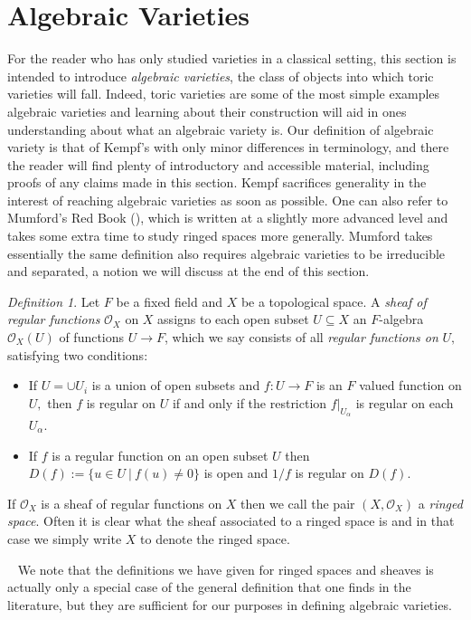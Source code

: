 \documentclass[BSc]{usydthesis}
\numberwithin{equation}{chapter}
\theoremstyle{remark}
\newtheorem{Definition}[equation]{Definition}
\begin{document}
\section{Algebraic Varieties}
For the reader who has only studied varieties in a classical setting, this section is intended to introduce {\em algebraic varieties}, the class of objects into which toric varieties will fall. Indeed, toric varieties are some of the most simple examples algebraic varieties and learning about their construction will aid in ones understanding about what an algebraic variety is. Our definition of algebraic variety is that of Kempf's \cite{Kempf} with only minor differences in terminology, and there the reader will find plenty of introductory and accessible material, including proofs of any claims made in this section. Kempf sacrifices generality in the interest of reaching algebraic varieties as soon as possible. One can also refer to Mumford's Red Book (\cite{MumfordRedBook}), which is written at a slightly more advanced level and takes some extra time to study ringed spaces more generally. Mumford takes essentially the same definition also requires algebraic varieties to be irreducible and separated, a notion we will discuss at the end of this section.
~
\begin{Definition}
Let $F$ be a fixed field and $X$ be a topological space. A {\em sheaf of regular functions} $\mathcal{O}_X$ on $X$ assigns to each open subset $U\subseteq X$ an $F$-algebra $\mathcal{O}_X(U)$ of functions $U\to F$, which we say consists of all {\em regular functions on} $U,$ satisfying two conditions:
  \begin{itemize}
   \item If $U=\cup U_{i}$ is a union of open subsets and $f:U\to F$ is an $F$ valued function on $U,$ then $f$ is regular on $U$ if and only if the restriction $f|_{U_{\alpha}}$ is regular on each $U_{\alpha}.$
   \item If $f$ is a regular function on an open subset $U$ then $D(f):= \{ u\in U \ | \ f(u)\neq 0 \}$ is open and $1/f$ is regular on $D(f).$
  \end{itemize}
If $\mathcal{O}_X$ is a sheaf of regular functions on $X$ then we call the pair $(X,\mathcal{O}_X)$ a {\em ringed space}. Often it is clear what the sheaf associated to a ringed space is and in that case we simply write $X$ to denote the ringed space.
\end{Definition}
~
We note that the definitions we have given for ringed spaces and sheaves is actually only a special case of the general definition that one finds in the literature, but they are sufficient for our purposes in defining algebraic varieties. 
\end{document}
